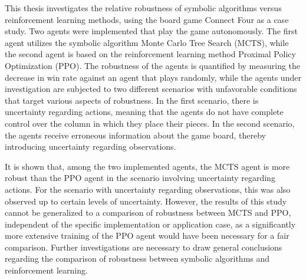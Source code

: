 This thesis investigates the relative robustness of symbolic algorithms versus reinforcement learning methods, using the board game Connect Four as a case study. Two agents were implemented that play the game autonomously. The first agent utilizes the symbolic algorithm Monte Carlo Tree Search (MCTS), while the second agent is based on the reinforcement learning method Proximal Policy Optimization (PPO). The robustness of the agents is quantified by measuring the decrease in win rate against an agent that plays randomly, while the agents under investigation are subjected to two different scenarios with unfavorable conditions that target various aspects of robustness. In the first scenario, there is uncertainty regarding actions, meaning that the agents do not have complete control over the column in which they place their pieces. In the second scenario, the agents receive erroneous information about the game board, thereby introducing uncertainty regarding observations.

It is shown that, among the two implemented agents, the MCTS agent is more robust than the PPO agent in the scenario involving uncertainty regarding actions. For the scenario with uncertainty regarding observations, this was also observed up to certain levels of uncertainty. However, the results of this study cannot be generalized to a comparison of robustness between MCTS and PPO, independent of the specific implementation or application case, as a significantly more extensive training of the PPO agent would have been necessary for a fair comparison. Further investigations are necessary to draw general conclusions regarding the comparison of robustness between symbolic algorithms and reinforcement learning.

\newpage